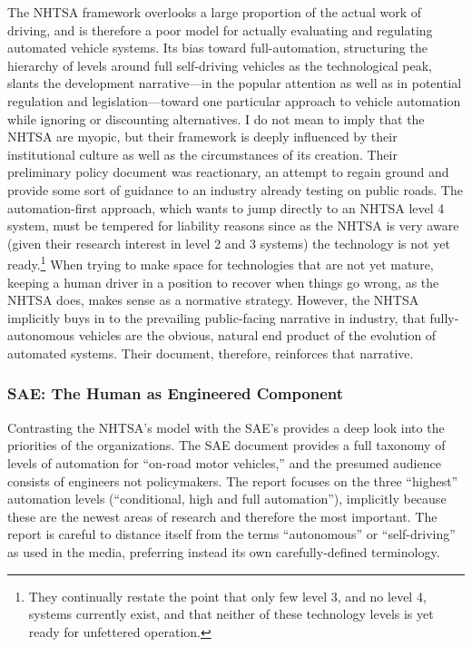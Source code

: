 The NHTSA framework overlooks a large proportion of the actual work of
driving, and is therefore a poor model for actually evaluating and
regulating automated vehicle systems. Its bias toward
full-automation, structuring the hierarchy of levels around full
self-driving vehicles as the technological peak, slants the
development narrative---in the popular attention as well as in
potential regulation and legislation---toward one particular approach
to vehicle automation while ignoring or discounting alternatives. I do
not mean to imply that the NHTSA are myopic, but their framework is
deeply influenced by their institutional culture as well as the
circumstances of its creation. Their preliminary policy document was
reactionary, an attempt to regain ground and provide some sort of guidance to an
industry already testing on public roads. The automation-first
approach, which wants to jump directly to an NHTSA level 4 system,
must be tempered for liability reasons since as the 
NHTSA is very aware (given their research interest in level 2 and 3
systems) the technology is not yet ready.\footnote{They continually
  restate the point that only few level 3, and no level 4, systems
  currently exist, and that neither of these technology levels is yet
  ready for unfettered operation.\cite[p. 10, 14]{NHTSA}} When trying to make space for
technologies that are not yet mature, keeping a human driver in a
position to recover when things go wrong, as the NHTSA does, makes sense as a normative
strategy. However, the NHTSA implicitly buys in to the prevailing
public-facing narrative in industry, that fully-autonomous vehicles
are the obvious, natural end product of the evolution of automated
systems. Their document, therefore, reinforces that narrative.

\subsubsection{SAE: The Human as Engineered Component}

Contrasting the NHTSA's model with the SAE's provides a deep look into
the priorities of the organizations. The SAE document provides a full
taxonomy of levels of automation for ``on-road motor vehicles,'' and the
presumed audience consists of engineers not policymakers.\cite{SAE} The report
focuses on the three ``highest'' automation levels (``conditional, high
and full automation''), implicitly because these are the newest areas
of research and therefore the most important. The report is careful to
distance itself from the terms ``autonomous'' or ``self-driving'' as used
in the media, preferring instead its own carefully-defined
terminology.\cite[p. 5-6]{SAE} 

